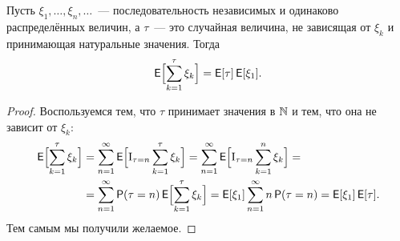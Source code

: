 \begin{theorem}
	Пусть \(\xi_{1}, \ldots, \xi_{n}, \ldots\)~--- последовательность независимых и одинаково 
	распределённых величин, а \(\tau\)~--- это случайная величина, не зависящая от \(\xi_{k}\) и 
	принимающая натуральные значения. Тогда
	\[
		\E\Bigl[\sum_{k = 1}^{\tau} \xi_{k}\Bigr] = \E[\tau]\E[\xi_{1}].
	\]
\end{theorem}
\begin{proof}
	Воспользуемся тем, что \(\tau\) принимает значения в \(\mathbb{N}\) и тем, что она не зависит от 
	\(\xi_{k}\):
	\begin{align*}
		\E\Bigl[\sum_{k = 1}^{\tau} \xi_{k}\Bigr] 
		&= \sum_{n = 1}^{\infty}\E\Bigl[\I_{\tau = n}\sum_{k = 1}^{\tau} \xi_{k}\Bigr]
		= \sum_{n = 1}^{\infty}\E\Bigl[\I_{\tau = n}\sum_{k = 1}^{n} \xi_{k}\Bigr] = \\
		&= \sum_{n = 1}^{\infty}\Pr(\tau = n)\E\Bigl[\sum_{k = 1}^{\tau} \xi_{k}\Bigr]
		= \E[\xi_{1}]\sum_{n = 1}^{\infty} n\Pr(\tau = n) = \E[\xi_{1}]\E[\tau].
	\end{align*}
	Тем самым мы получили желаемое.
\end{proof}

